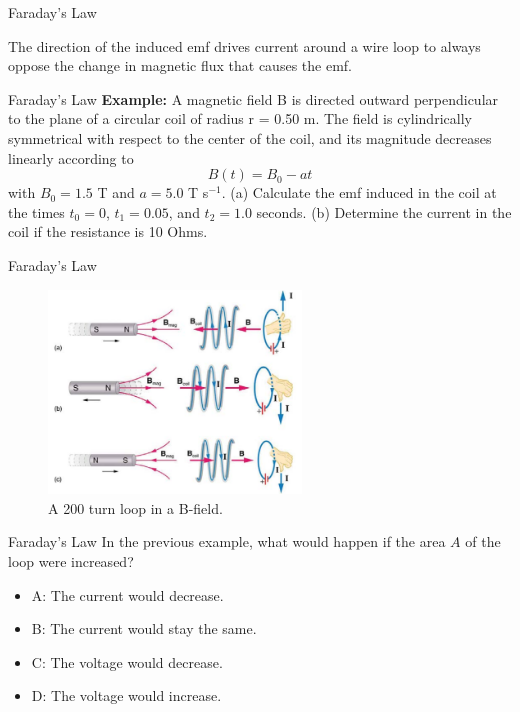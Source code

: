 \documentclass{beamer}
\begin{document}
\begin{frame}{Faraday's Law}
\begin{tcolorbox}[colback=white,colframe=black!40!black,title=Lenz's Law]
\alert{The direction of the induced emf drives current around a wire loop to always oppose the change in magnetic flux that
causes the emf.}
\end{tcolorbox}
\end{frame}

\begin{frame}{Faraday's Law}
\small
\textbf{Example:}
A magnetic field B is directed outward perpendicular to the plane of a circular coil of radius r = 0.50 m.  The field is cylindrically symmetrical with respect to the center of the coil, and its magnitude decreases linearly according to
\begin{equation}
B(t) = B_0 - a t
\end{equation}
with $B_0 = 1.5$ T and $a = 5.0$ T s$^{-1}$.  (a) Calculate the emf induced in the coil at the times $t_0 = 0$, $t_1 = 0.05$, and $t_2 = 1.0$ seconds. (b) Determine the current in the coil if the resistance is 10 Ohms. 
\end{frame}

\begin{frame}{Faraday's Law}
\begin{figure}
\centering
\includegraphics[width=0.6\textwidth]{figures/lenzspecific.png}
\caption{\label{fig:lenz11} A 200 turn loop in a B-field.}
\end{figure}
\end{frame}

\begin{frame}{Faraday's Law}
In the previous example, what would happen if the area $A$ of the loop were increased?
\begin{itemize}
\item A: The current would decrease.
\item B: The current would stay the same.
\item C: The voltage would decrease.
\item D: The voltage would increase.
\end{itemize}
\end{frame}
\end{document}
